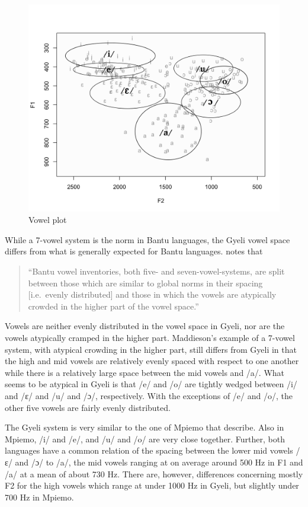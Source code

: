 \begin{figure} 
\centering
\includegraphics[width=\textwidth]{figures/Vowel-plot-mini}
\caption{Vowel plot}
\label{Fig:plot}
\end{figure}

While a 7-vowel system is the norm in Bantu languages, the Gyeli vowel space differs from what is generally expected for Bantu languages. \citet[18]{maddieson2003a} notes that 
\begin{quote}
``Bantu vowel inventories, both five- and seven-vowel-systems, are split between those which are similar to global norms in their spacing [i.e.\ evenly distributed] and those in which the vowels are atypically crowded in the higher part of the vowel space.''
\end{quote}
Vowels are neither evenly distributed in the vowel space in Gyeli, nor are the vowels atypically cramped in the higher part. Maddieson's example of a 7-vowel system, with atypical crowding in the higher part, still differs from Gyeli in that the high and mid vowels are relatively evenly spaced with respect to one another while there is a relatively large space between the mid vowels and /a/. What seems to be atypical in Gyeli is that /e/ and /o/ are tightly wedged between /i/ and /ɛ/ and /u/ and /ɔ/, respectively. With the exceptions of /e/ and /o/, the other five vowels are fairly evenly distributed.

 The Gyeli system is very similar to the one of Mpiemo that \citet[167]{thornell2004} describe. Also in Mpiemo, /i/ and /e/, and /u/ and /o/ are very close together. Further, both languages have a common relation of the spacing between the lower mid vowels /ɛ/ and /ɔ/ to /a/, the mid vowels ranging at on average around 500 Hz in F1 and /a/ at a mean of about 730 Hz. There are, however, differences concerning mostly F2 for the high vowels which range at under 1000 Hz in Gyeli, but slightly under 700 Hz in Mpiemo. 


